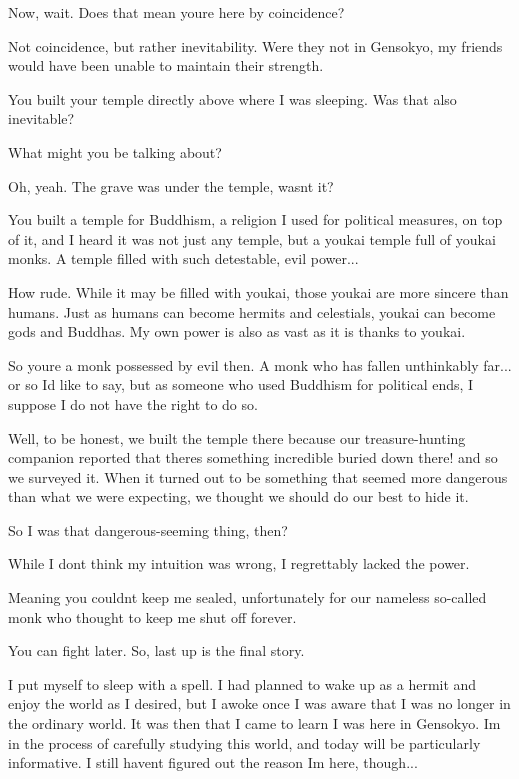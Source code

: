 \begin{tcolorbox}[breakable, colback=white, colframe=black!80,
  boxrule=0.6pt, arc=0mm, left=3mm, right=3mm, top=2mm, bottom=2mm]
\medskip
Now, wait. Does that mean you\textquotesingle{}re here by coincidence?\par
\medskip
Not coincidence, but rather inevitability. Were they not in Gensokyo, my friends would have been unable to maintain their strength.\par
\medskip
You built your temple directly above where I was sleeping. Was that also inevitable?\par
\medskip
What might you be talking about?\par
\medskip
Oh, yeah. The grave was under the temple, wasn\textquotesingle{}t it?\par
\medskip
You built a temple for Buddhism, a religion I used for political measures, on top of it, and I heard it was not just any temple, but a youkai temple full of youkai monks. A temple filled with such detestable, evil power...\par
\medskip
How rude. While it may be filled with youkai, those youkai are more sincere than humans. Just as humans can become hermits and celestials, youkai can become gods and Buddhas. My own power is also as vast as it is thanks to youkai.\par
\medskip
So you\textquotesingle{}re a monk possessed by evil then. A monk who has fallen unthinkably far... or so I\textquotesingle{}d like to say, but as someone who used Buddhism for political ends, I suppose I do not have the right to do so.\par
\medskip
Well, to be honest, we built the temple there because our treasure-{}hunting companion reported that \textquotedbl{}there\textquotesingle{}s something incredible buried down there!\textquotedbl{} and so we surveyed it. When it turned out to be something that seemed more dangerous than what we were expecting, we thought we should do our best to hide it.\par
\medskip
So I was that dangerous-{}seeming thing, then?\par
\medskip
While I don\textquotesingle{}t think my intuition was wrong, I regrettably lacked the power.\par
\medskip
Meaning you couldn\textquotesingle{}t keep me sealed, unfortunately for our nameless so-{}called monk who thought to keep me shut off forever.\par
{}\par
\medskip
You can fight later. So, last up is the final story.\par
\medskip
I put myself to sleep with a spell. I had planned to wake up as a hermit and enjoy the world as I desired, but I awoke once I was aware that I was no longer in the ordinary world. It was then that I came to learn I was here in Gensokyo. I\textquotesingle{}m in the process of carefully studying this world, and today will be particularly informative. I still haven\textquotesingle{}t figured out the reason I\textquotesingle{}m here, though...\par

\end{tcolorbox}
